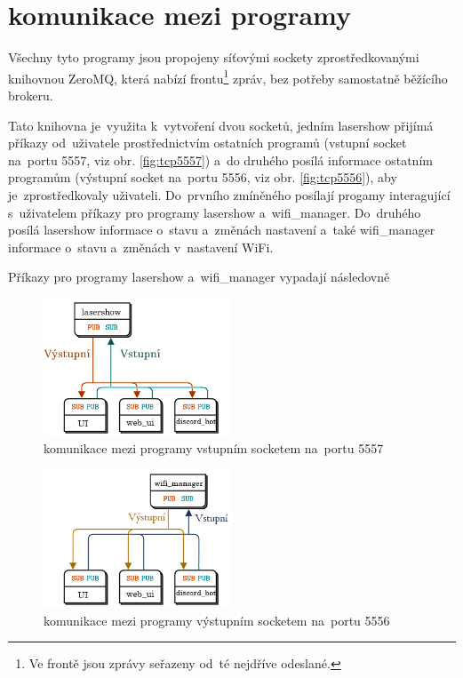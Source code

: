 \section{komunikace mezi programy} \label{sec:comms}
Všechny tyto programy jsou propojeny síťovými sockety zprostředkovanými knihovnou ZeroMQ, která nabízí frontu\footnote{Ve frontě jsou zprávy seřazeny od~té nejdříve odeslané.} zpráv, bez potřeby samostatně běžícího brokeru.

Tato knihovna je~využita k~vytvoření dvou socketů, jedním lasershow přijímá příkazy od~uživatele prostřednictvím ostatních programů (vstupní socket na~portu 5557, viz obr. \ref{fig:tcp5557}) a~do druhého posílá informace ostatním programům (výstupní socket na~portu 5556, viz obr. \ref{fig:tcp5556}), aby je~zprostředkovaly uživateli.
Do~prvního zmíněného posílají progamy interagující s~uživatelem příkazy pro programy lasershow a~wifi\_manager. Do~druhého posílá lasershow informace o~stavu a~změnách nastavení  a~také wifi\_manager informace o~stavu a~změnách v~nastavení WiFi.

Příkazy pro programy lasershow a~wifi\_manager vypadají následovně

\begin{figure}[!htb]
  \centering
  \includegraphics[width=0.5\textwidth]{img/comms_lasershow_scheme.jpg}
  \caption{\label{fig:lasershow_comms}komunikace mezi programy vstupním socketem na~portu 5557}
\end{figure}
\begin{figure}[!htb]
  \centering
  \includegraphics[width=0.5\textwidth]{img/comms_wifiman_scheme.jpg}
  \caption{\label{fig:lasershow_comms}komunikace mezi programy výstupním socketem na~portu 5556}
\end{figure}